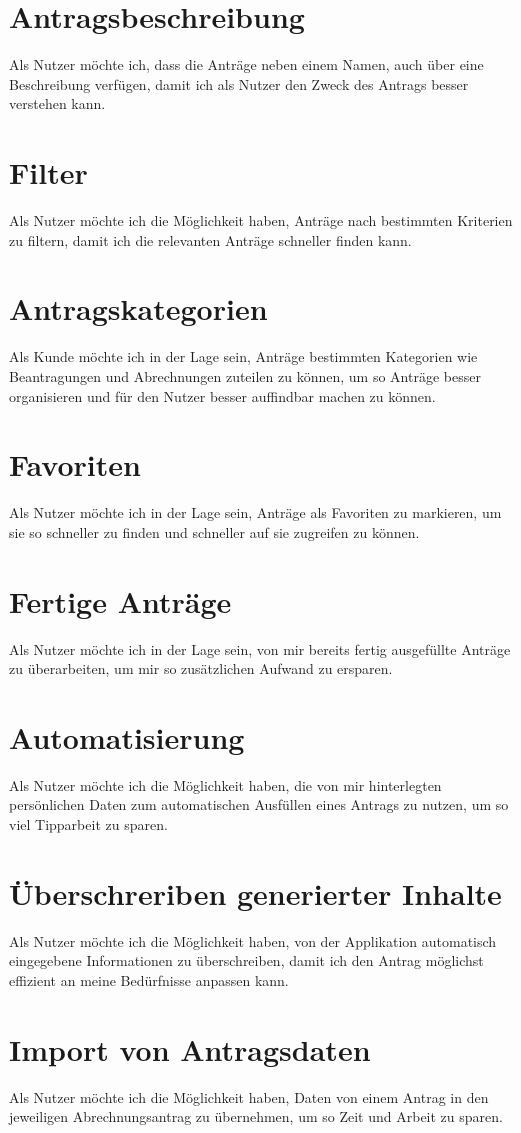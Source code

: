 \section{Antragsbeschreibung}
Als Nutzer möchte ich, dass die Anträge neben einem Namen, auch über eine Beschreibung verfügen, damit
ich als Nutzer den Zweck des Antrags besser verstehen kann.
\section{Filter}
Als Nutzer möchte ich die Möglichkeit haben, Anträge nach bestimmten Kriterien zu filtern, 
damit ich die relevanten Anträge schneller finden kann.
\section{Antragskategorien}
Als Kunde möchte ich in der Lage sein, Anträge bestimmten Kategorien wie Beantragungen und 
Abrechnungen zuteilen zu können, um so Anträge besser organisieren und für den Nutzer besser auffindbar machen zu können.
\section{Favoriten}
Als Nutzer möchte ich in der Lage sein, Anträge als Favoriten zu markieren, um sie so schneller zu 
finden und schneller auf sie zugreifen zu können.
\section{Fertige Anträge}
Als Nutzer möchte ich in der Lage sein, von mir bereits fertig ausgefüllte Anträge zu überarbeiten, um 
mir so zusätzlichen Aufwand zu ersparen.
\section{Automatisierung}
Als Nutzer möchte ich die Möglichkeit haben, die von mir hinterlegten persönlichen Daten zum 
automatischen Ausfüllen eines Antrags zu nutzen, um so viel Tipparbeit zu sparen.
\section{Überschreriben generierter Inhalte}
Als Nutzer möchte ich die Möglichkeit haben, von der Applikation automatisch eingegebene Informationen 
zu überschreiben, damit ich den Antrag möglichst effizient an meine Bedürfnisse anpassen kann.
\section{Import von Antragsdaten}
Als Nutzer möchte ich die Möglichkeit haben, Daten von einem Antrag in den jeweiligen 
Abrechnungsantrag zu übernehmen, um so Zeit und Arbeit zu sparen.
